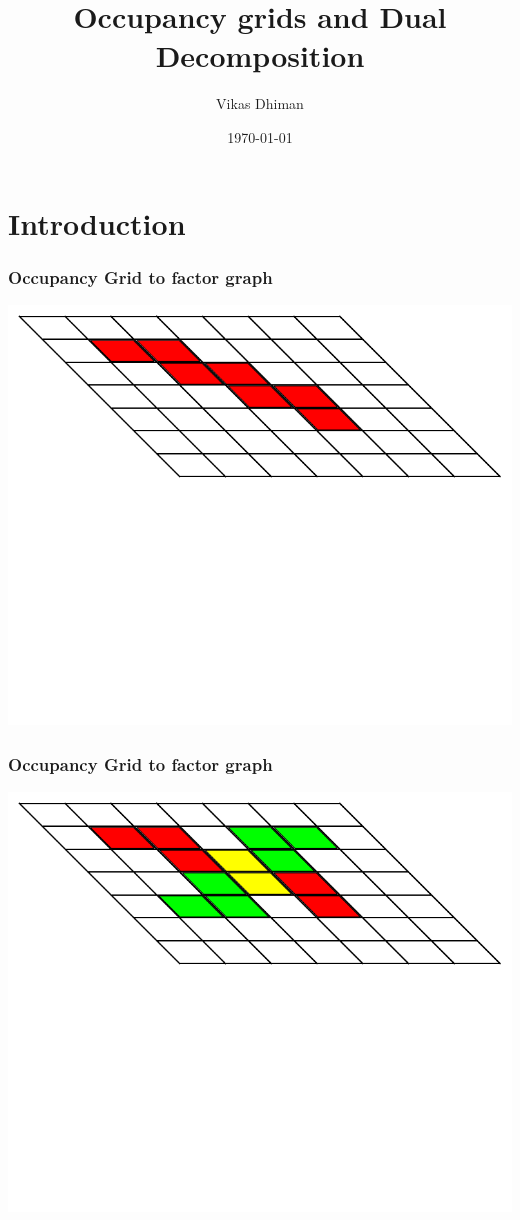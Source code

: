 \documentclass{beamer}
\title{Occupancy grids and Dual Decomposition}
\author{Vikas Dhiman}
\date{\today}
\institute{\url{vikasdhi@buffalo.edu}}
\begin{document}
\begin{frame}
\titlepage
\end{frame}


\section{Introduction}

\begin{frame}
\frametitle{Occupancy Grid to factor graph}
\includegraphics[width=\textwidth]{figures/factorgraph/fg0.pdf}
\end{frame}

\begin{frame}
\frametitle{Occupancy Grid to factor graph}
\includegraphics[width=\textwidth]{figures/factorgraph/fg1.pdf}
\end{frame}
\end{document}
